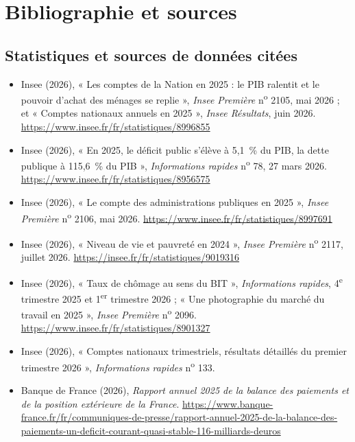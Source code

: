\chapter*{Bibliographie et sources}

\begin{small}
\section*{Statistiques et sources de données citées}
\begin{itemize}[leftmargin=1em]
\item Insee (2026), « Les comptes de la Nation en 2025 : le PIB ralentit et le pouvoir d'achat des ménages se replie »,
\emph{Insee Première} n\textsuperscript{o} 2105, mai 2026 ; et « Comptes nationaux annuels en 2025 », \emph{Insee
Résultats}, juin 2026. \url{https://www.insee.fr/fr/statistiques/8996855}
\item Insee (2026), « En 2025, le déficit public s'élève à 5,1~\% du PIB, la dette publique à 115,6~\% du PIB »,
\emph{Informations rapides} n\textsuperscript{o} 78, 27 mars 2026. \url{https://www.insee.fr/fr/statistiques/8956575}
\item Insee (2026), « Le compte des administrations publiques en 2025 », \emph{Insee Première} n\textsuperscript{o} 2106,
mai 2026. \url{https://www.insee.fr/fr/statistiques/8997691}
\item Insee (2026), « Niveau de vie et pauvreté en 2024 », \emph{Insee Première} n\textsuperscript{o} 2117, juillet 2026.
\url{https://insee.fr/fr/statistiques/9019316}
\item Insee (2026), « Taux de chômage au sens du BIT », \emph{Informations rapides}, 4\textsuperscript{e} trimestre 2025 et
1\textsuperscript{er} trimestre 2026 ; « Une photographie du marché du travail en 2025 », \emph{Insee Première}
n\textsuperscript{o} 2096. \url{https://www.insee.fr/fr/statistiques/8901327}
\item Insee (2026), « Comptes nationaux trimestriels, résultats détaillés du premier trimestre 2026 »,
\emph{Informations rapides} n\textsuperscript{o} 133.
\item Banque de France (2026), \emph{Rapport annuel 2025 de la balance des paiements et de la position extérieure de la
France}. \url{https://www.banque-france.fr/fr/communiques-de-presse/rapport-annuel-2025-de-la-balance-des-paiements-un-deficit-courant-quasi-stable-116-milliards-deuros}

\end{itemize}
\end{small}

